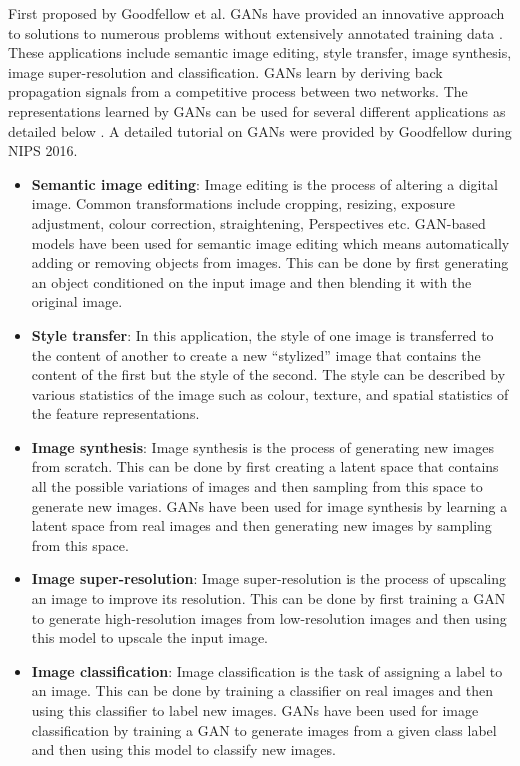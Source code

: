 First proposed by Goodfellow et al. \cite{Goodfellow2014} \glspl{GAN} have provided an innovative approach to solutions to numerous problems without extensively annotated training data \cite{Creswell2017}. These applications include semantic image editing, style transfer, image synthesis, image super-resolution and classification. \glspl{GAN} learn by deriving back propagation signals from a competitive process between two networks. The representations learned by \glspl{GAN} can be used for several different applications as detailed below \cite{Alqahtani2021}. A detailed tutorial on \glspl{GAN} were provided by Goodfellow \cite{Goodfellow2016} during \gls{NIPS} 2016.

\begin{itemize}
    \item \textbf{Semantic image editing}: Image editing is the process of altering a digital image. Common transformations include cropping, resizing, exposure adjustment, colour correction, straightening, Perspectives etc. \Gls{GAN}-based models have been used for semantic image editing which means automatically adding or removing objects from images. This can be done by first generating an object conditioned on the input image and then blending it with the original image. 
    \item \textbf{Style transfer}: In this application, the style of one image is transferred to the content of another to create a new ``stylized'' image that contains the content of the first but the style of the second. The style can be described by various statistics of the image such as colour, texture, and spatial statistics of the feature representations.
    \item \textbf{Image synthesis}: Image synthesis is the process of generating new images from scratch. This can be done by first creating a latent space that contains all the possible variations of images and then sampling from this space to generate new images. \Glspl{GAN} have been used for image synthesis by learning a latent space from real images and then generating new images by sampling from this space.
    \item \textbf{Image super-resolution}: Image super-resolution is the process of upscaling an image to improve its resolution. This can be done by first training a \gls{GAN} to generate high-resolution images from low-resolution images and then using this model to upscale the input image.
    \item \textbf{Image classification}: Image classification is the task of assigning a label to an image. This can be done by training a classifier on real images and then using this classifier to label new images. \Glspl{GAN} have been used for image classification by training a \gls{GAN} to generate images from a given class label and then using this model to classify new images.
\end{itemize}

